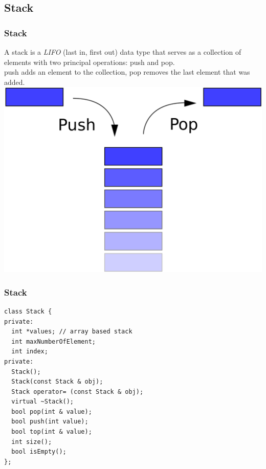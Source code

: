 \subsection{Stack}
\begin{frame}[fragile]
\frametitle{Stack}
A stack is a \emph{LIFO} (last in, first out) data type that serves as a collection
of elements with two principal operations: push and pop.\\
push adds an element to the collection, pop removes the last element that was added.\\
\vspace{1mm}
\includegraphics[scale=0.06]{img/stack.png}
\end{frame}

\begin{frame}[fragile]
\frametitle{Stack}
{\tiny
\begin{lstlisting}
class Stack {
private:
  int *values; // array based stack
  int maxNumberOfElement;
  int index;
private:
  Stack();
  Stack(const Stack & obj);
  Stack operator= (const Stack & obj);
  virtual ~Stack();
  bool pop(int & value);
  bool push(int value);
  bool top(int & value);
  int size();
  bool isEmpty();
};
\end{lstlisting}
}
\end{frame}

